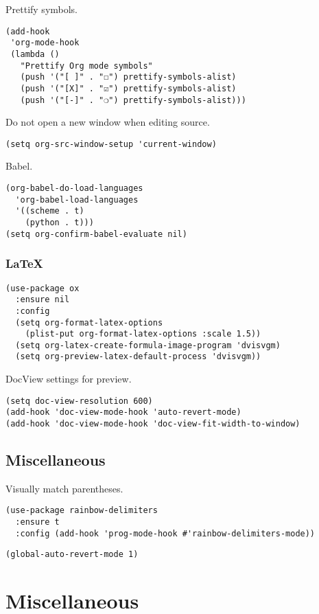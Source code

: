 \documentclass[a4paper,11pt]{article}
\begin{document}
Prettify symbols.
\begin{verbatim}
(add-hook
 'org-mode-hook
 (lambda ()
   "Prettify Org mode symbols"
   (push '("[ ]" . "☐") prettify-symbols-alist)
   (push '("[X]" . "☑") prettify-symbols-alist)
   (push '("[-]" . "❍") prettify-symbols-alist)))
\end{verbatim}

Do not open a new window when editing source.
\begin{verbatim}
(setq org-src-window-setup 'current-window)
\end{verbatim}

Babel.
\begin{verbatim}
(org-babel-do-load-languages
  'org-babel-load-languages
  '((scheme . t)
    (python . t)))
(setq org-confirm-babel-evaluate nil)
\end{verbatim}

\subsubsection{\LaTeX{}}
\label{sec:org5432e64}
\begin{verbatim}
(use-package ox
  :ensure nil
  :config
  (setq org-format-latex-options
	(plist-put org-format-latex-options :scale 1.5))
  (setq org-latex-create-formula-image-program 'dvisvgm)
  (setq org-preview-latex-default-process 'dvisvgm))
\end{verbatim}

DocView settings for preview.
\begin{verbatim}
(setq doc-view-resolution 600)
(add-hook 'doc-view-mode-hook 'auto-revert-mode)
(add-hook 'doc-view-mode-hook 'doc-view-fit-width-to-window)
\end{verbatim}

\subsection{Miscellaneous}
\label{sec:orge10007f}
Visually match parentheses.
\begin{verbatim}
(use-package rainbow-delimiters
  :ensure t
  :config (add-hook 'prog-mode-hook #'rainbow-delimiters-mode))
\end{verbatim}

\begin{verbatim}
(global-auto-revert-mode 1)
\end{verbatim}

\section{Miscellaneous}
\label{sec:org90f9155}
\end{document}
